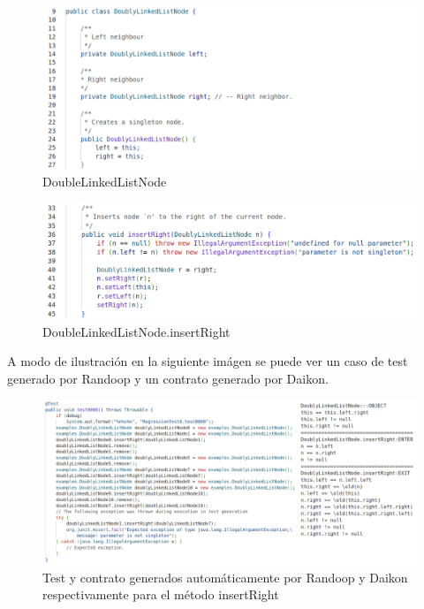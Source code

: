 \begin{figure}[ht]
\centering
\includegraphics[width=1\textwidth]{doublelinkedlistnode/constructor.png}
\caption{DoubleLinkedListNode}
\label{fig:DoubleLinkedListNode}
\end{figure}


\begin{figure}[ht]
\centering
\includegraphics[width=1\textwidth]{doublelinkedlistnode/insertRight.png}
\caption{DoubleLinkedListNode.insertRight}
\label{fig:DoubleLinkedListNodeInsertRight}
\end{figure}

A modo de ilustración en la siguiente imágen se puede ver un caso de test generado por Randoop y un contrato generado por Daikon.

\begin{figure}[ht]
\centering
\includegraphics[width=1\textwidth]{doublelinkedlistnode/randoop-daikon-example.png}
\caption{Test y contrato generados automáticamente por Randoop y Daikon respectivamente para el método insertRight}
\label{fig:DoubleLinkedListNodeTests}
\end{figure}
